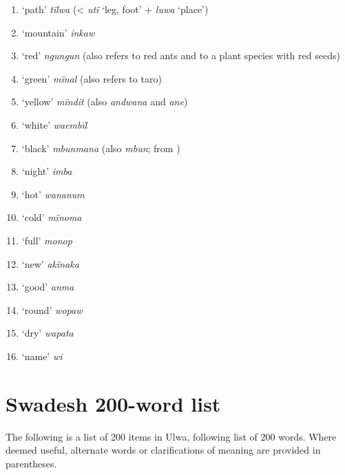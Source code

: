 \begin{enumerate}[noitemsep, label={\arabic*}, align=left, widest=190, labelsep=1ex,leftmargin=*]
\item ‘path’ \textit{tïlwa} (< \textit{utï} ‘leg, foot’ + \textit{luwa} ‘place’)

\item ‘mountain’ \textit{inkaw}

\item ‘red’ \textit{ngungun} (also refers to red ants and to a plant species with red seeds)

\item ‘green’ \textit{mïnal} (also refers to taro)

\item ‘yellow’ \textit{mïndit} (also \textit{andwana} and \textit{ane})

\item ‘white’ \textit{waembïl}

\item ‘black’ \textit{mbunmana} (also \textit{mbun};  from )

\item ‘night’ \textit{imba}

\item ‘hot’ \textit{wananum}

\item ‘cold’ \textit{mïnoma}

\item ‘full’ \textit{monop}

\item ‘new’ \textit{akïnaka}

\item ‘good’ \textit{anma}

\item ‘round’ \textit{wopaw}

\item ‘dry’ \textit{wapata}

\item ‘name’ \textit{wi}
\end{enumerate}



\chapter{Swadesh 200-word list}\label{sec:app.b}


The following is a list of 200  items in Ulwa, following  list of 200 words. Where deemed useful, alternate words or clarifications of meaning are provided in parentheses.\\


